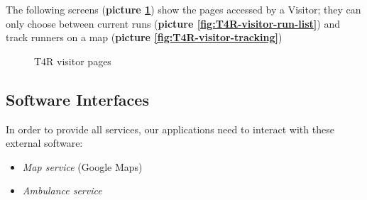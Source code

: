 The following screens (\textbf{picture \ref{fig:T4R-visitor-pages}}) show the pages accessed by a Visitor; they can only choose between current runs (\textbf{picture \ref{fig:T4R-visitor-run-list}}) and track runners on a map (\textbf{picture \ref{fig:T4R-visitor-tracking}})

\begin{figure}[H]
  \centering
  \caption{T4R visitor pages}
  \label{fig:T4R-visitor-pages}
\end{figure}

\subsection{Software Interfaces}
%
 In order to provide all services, our applications need to interact with these external software:
\begin{itemize}
    \item \emph{Map service} (Google Maps)
    \item \emph{Ambulance service}
\end{itemize}

